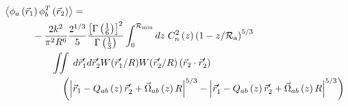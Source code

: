 \begin{equation}\label{tprphase_n6}
\begin{aligned}
&\left\langle \phi_{a}\left(\vec{r}_{1}\right) \phi^{T}_{b}\left(\vec{r}_{2}\right)\right\rangle = \\
&\quad\quad\quad
-\frac{2k^{2}}{\pi^{2}R^{6}} 
\frac{2^{1/3}}{5}\frac{\left[\Gamma\left(\frac{1}{6}\right)\right]^{2}}{\Gamma\left(\frac{1}{3}\right)} 
\int_{0}^{\mathcal{R}_{\rm min}} dz\;C_{n}^{2}\left(z\right) 
\left(1 - z/\mathcal{R}_{\rm a}\right)^{5/3}\\
&\quad\quad\quad\quad\quad
\iint  \; d\vec{r}^{\prime}_{1}d\vec{r}^{\prime}_{2} W(\vec{r}^{\prime}_{1}/R) W(\vec{r}^{\prime}_{2}/R)
\left(\vec{r}_{2} \cdot \vec{r}^{\prime}_{2}\right)
\\
&\quad\quad\quad\quad\quad\quad
\left(
\left\vert \vec{r}_{1} - Q_{ab}\left(z\right)\vec{r}^{\prime}_{2} + \vec{\Omega}_{ab}\left(z\right) R\right\vert^{5/3}
- \left\vert \vec{r}^{\prime}_{1}  - 
 Q_{ab}\left(z\right)\vec{r}^{\prime}_{2} + \vec{\Omega}_{ab}\left(z\right) R \right\vert^{5/3}
\right)
\end{aligned}
\end{equation}

